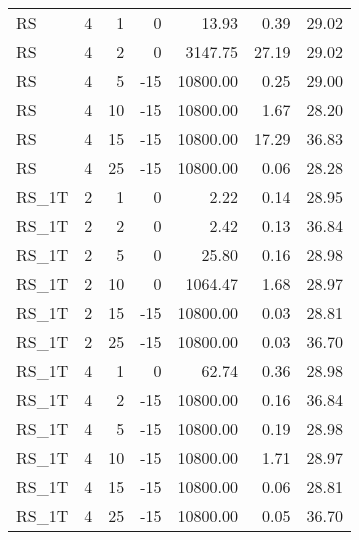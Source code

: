 \begin{center}
\begin{longtable}{lrrrrrr}
  RS     & 4 & 1 &   0 & 13.93 & 0.39 & 29.02 \\ 
  RS     & 4 & 2 &   0 & 3147.75 & 27.19 & 29.02 \\ 
  RS     & 4 & 5 & -15 & 10800.00 & 0.25 & 29.00 \\ 
  RS     & 4 & 10 & -15 & 10800.00 & 1.67 & 28.20 \\ 
  RS     & 4 & 15 & -15 & 10800.00 & 17.29 & 36.83 \\ 
  RS     & 4 & 25 & -15 & 10800.00 & 0.06 & 28.28 \\ 
  RS\_1T     & 2 & 1 &   0 & 2.22 & 0.14 & 28.95 \\ 
  RS\_1T     & 2 & 2 &   0 & 2.42 & 0.13 & 36.84 \\ 
  RS\_1T     & 2 & 5 &   0 & 25.80 & 0.16 & 28.98 \\ 
  RS\_1T     & 2 & 10 &   0 & 1064.47 & 1.68 & 28.97 \\ 
  RS\_1T     & 2 & 15 & -15 & 10800.00 & 0.03 & 28.81 \\ 
  RS\_1T     & 2 & 25 & -15 & 10800.00 & 0.03 & 36.70 \\ 
  RS\_1T     & 4 & 1 &   0 & 62.74 & 0.36 & 28.98 \\ 
  RS\_1T     & 4 & 2 & -15 & 10800.00 & 0.16 & 36.84 \\ 
  RS\_1T     & 4 & 5 & -15 & 10800.00 & 0.19 & 28.98 \\ 
  RS\_1T     & 4 & 10 & -15 & 10800.00 & 1.71 & 28.97 \\ 
  RS\_1T     & 4 & 15 & -15 & 10800.00 & 0.06 & 28.81 \\ 
  RS\_1T     & 4 & 25 & -15 & 10800.00 & 0.05 & 36.70 \\ 
\end{longtable}
\end{center}
